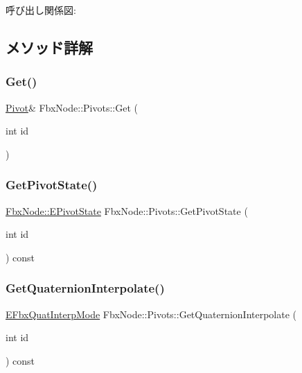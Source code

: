 呼び出し関係図\+:


\subsection{メソッド詳解}
\mbox{\label{class_fbx_node_1_1_pivots_a1ae16796ba3d563384aa142bc6f4268c}} 
\subsubsection{\texorpdfstring{Get()}{Get()}}
{\footnotesize\ttfamily \hyperlink{class_fbx_node_1_1_pivot}{Pivot}\& Fbx\+Node\+::\+Pivots\+::\+Get (\begin{DoxyParamCaption}\item[{int}]{id }\end{DoxyParamCaption})}

\mbox{\label{class_fbx_node_1_1_pivots_a70917508966d4f14357fe678e1024eae}} 
\subsubsection{\texorpdfstring{Get\+Pivot\+State()}{GetPivotState()}}
{\footnotesize\ttfamily \hyperlink{class_fbx_node_a153fc75958227fc6728a2233b630b58a}{Fbx\+Node\+::\+E\+Pivot\+State} Fbx\+Node\+::\+Pivots\+::\+Get\+Pivot\+State (\begin{DoxyParamCaption}\item[{int}]{id }\end{DoxyParamCaption}) const}

\mbox{\label{class_fbx_node_1_1_pivots_acc6e16a61e8411938939ac3a4dde3f33}} 
\subsubsection{\texorpdfstring{Get\+Quaternion\+Interpolate()}{GetQuaternionInterpolate()}}
{\footnotesize\ttfamily \hyperlink{fbxmath_8h_a9c7a0dfb52c83256d4a92c5c6d1be72a}{E\+Fbx\+Quat\+Interp\+Mode} Fbx\+Node\+::\+Pivots\+::\+Get\+Quaternion\+Interpolate (\begin{DoxyParamCaption}\item[{int}]{id }\end{DoxyParamCaption}) const}

